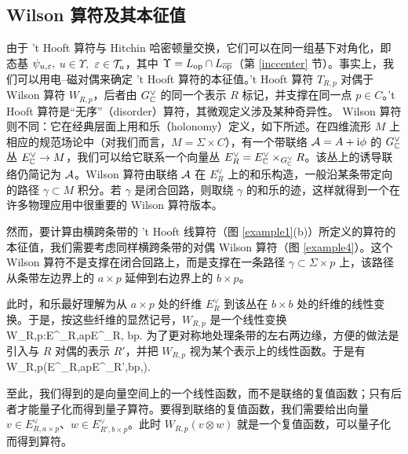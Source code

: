\subsection{Wilson 算符及其本征值}\label{wilop}

由于 't Hooft 算符与 Hitchin 哈密顿量交换，它们可以在同一组基下对角化，即态基 $\psi_{u,\varepsilon},$ $u\in \Upsilon,$ $\varepsilon\in {\mathcal T}_u$，其中 $\Upsilon=L_{\mathrm{op}}\cap L_{\overline{\mathrm{op}}}$（第 \ref{inccenter} 节）。事实上，我们可以用电–磁对偶来确定 't Hooft 算符的本征值。't Hooft 算符 $T_{R,p}$ 对偶于 Wilson 算符 $W_{R,p}$，后者由 $G^\vee_{\mathbb C}$ 的同一个表示 $R$ 标记，并支撑在同一点 $p\in C$。't Hooft 算符是“无序”（disorder）算符，其微观定义涉及某种奇异性。 Wilson 算符则不同：它在经典层面上用和乐（holonomy）定义，如下所述。在四维流形 $M$ 上相应的规范场论中（对我们而言，$M=\Sigma\times C$），有一个带联络 ${\mathcal A}=A+{\mathrm i} \phi$ 的 $G^\vee_{\mathbb C}$ 丛 $E^\vee_{\mathbb C}\to M$，我们可以给它联系一个向量丛 $E^\vee_R=E^\vee_{\mathbb C}\times_{G^\vee_{\mathbb C}} R$。该丛上的诱导联络仍简记为 ${\mathcal A}$。Wilson 算符由联络 ${\mathcal A}$ 在 $E^\vee_R$ 上的和乐构造，一般沿某条带定向的路径 $\gamma\subset M$ 积分。若 $\gamma$ 是闭合回路，则取绕 $\gamma$ 的和乐的迹，这样就得到一个在许多物理应用中很重要的 Wilson 算符版本。

然而，要计算由横跨条带的 't Hooft 线算符（图 \ref{example1}(b)）所定义的算符的本征值，我们需要考虑同样横跨条带的对偶 Wilson 算符（图 \ref{example4}）。这个 Wilson 算符不是支撑在闭合回路上，而是支撑在一条路径 $\gamma\subset \Sigma\times p$ 上，该路径从条带左边界上的 $a\times p$ 延伸到右边界上的 $b\times p$。

此时，和乐最好理解为从 $a\times p$ 处的纤维 $E^\vee_R$ 到该丛在 $b\times b$ 处的纤维的线性变换。于是，按这些纤维的显然记号，$W_{R,p}$ 是一个线性变换
\be\label{lintr} W_{R,p}:E^\vee_{R,a\times p}\to E^\vee_{R, b\times p}.\ee
为了更对称地处理条带的左右两边缘，方便的做法是引入与 $R$ 对偶的表示 $R'$，并把 $W_{R,p}$ 视为某个表示上的线性函数。于是有
\be\label{bintr} W_{R,p}\in \Hom(E^\vee_{R,a\times p}\otimes E^\vee_{R',b\times p},\C). \ee

至此，我们得到的是向量空间上的一个线性函数，而不是联络的复值函数；只有后者才能量子化而得到量子算符。要得到联络的复值函数，我们需要给出向量 $v\in E^\vee_{R,a\times p}$、$w\in E^\vee_{R',b\times p}$。此时 $W_{R,p}(v\otimes w)$ 就是一个复值函数，可以量子化而得到算符。

